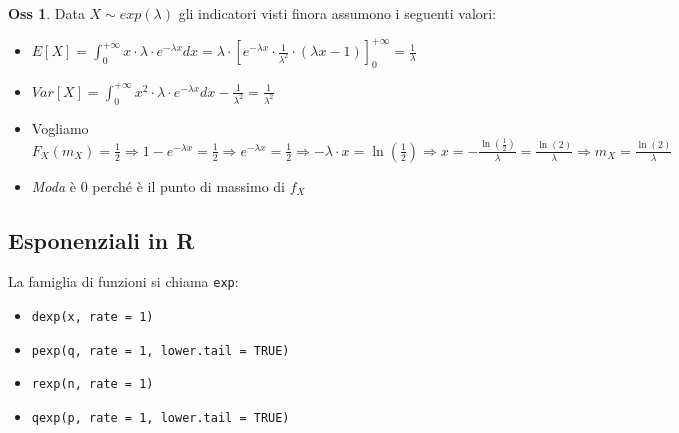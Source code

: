 \documentclass[12pt, a4paper]{report}
\theoremstyle{definition}
\newtheorem*{observation}{Oss}
\begin{document}
\begin{center}
\end{center}

\begin{observation}
	Data \(X\sim exp(\lambda)\) gli indicatori visti finora assumono i seguenti
	valori:
	\begin{itemize}
		\item \(E[X]=\int_0^{+\infty}x\cdot \lambda\cdot e^{-\lambda x}dx=\lambda\cdot \left[
		e^{-\lambda x}\cdot \frac{1}{\lambda^2}\cdot (\lambda x-1)\right]_0^{+\infty}=
		\frac{1}{\lambda}\)
		\item \(Var[X]=\int_0^{+\infty}x^2\cdot \lambda\cdot e^{-\lambda x}dx-\frac{1}
		{\lambda^2}=\frac{1}{\lambda^2}\)
		\item Vogliamo \(F_X(m_X)=\frac{1}{2}\Rightarrow 1-e^{-\lambda x}=\frac{1}{2}
		\Rightarrow e^{-\lambda x}=\frac{1}{2}\Rightarrow -\lambda\cdot x=\ln\left(
		\frac{1}{2}\right)\Rightarrow x=-\frac{\ln\left(\frac{1}{2}\right)}{\lambda}
		=\frac{\ln(2)}{\lambda}\Rightarrow m_X=\frac{\ln(2)}{\lambda}\)
		\item \emph{Moda} è 0 perché è il punto di massimo di $f_X$
	\end{itemize}
\end{observation}

\subsection{Esponenziali in R}
La famiglia di funzioni si chiama \texttt{exp}:
\begin{itemize}
	\item \texttt{dexp(x, rate = 1)}
	\item \texttt{pexp(q, rate = 1, lower.tail = TRUE)}
	\item \texttt{rexp(n, rate = 1)}
	\item \texttt{qexp(p, rate = 1, lower.tail = TRUE)}
\end{itemize}
\end{document}
